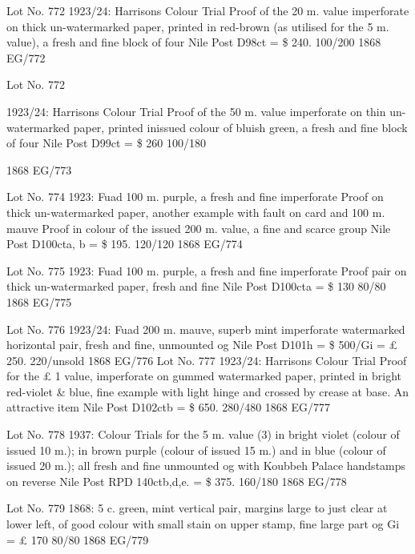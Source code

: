 \documentclass[justified]{tufte-book}
\begin{document}
%
{Lot No. 772
1923/24: Harrisons Colour Trial Proof of the 20 m. value imperforate on thick un-watermarked paper, printed in red-brown (as utilised for the 5 m. value), a fresh and fine block of four Nile Post D98ct = \$ 240. 100/200
}%
{1868}%
{EG/772}%
{}%
{}
{}%
{}

%
{Lot No. 772

1923/24: Harrisons Colour Trial Proof of the 50 m. value imperforate on thin un-watermarked paper, printed inissued colour of bluish green, a fresh and fine block of four Nile Post D99ct = \$ 260 100/180
}%
{1868}%
{EG/773}%
{}%
{}
{}%
{}

%
{Lot No. 774
1923: Fuad 100 m. purple, a fresh and fine imperforate Proof on thick un-watermarked paper, another example with fault on card and 100 m. mauve Proof in colour of the issued 200 m. value, a fine and scarce group Nile Post D100cta, b = \$ 195. 120/120
}%
{1868}%
{EG/774}%
{}%
{}
{}%
{}

%
{Lot No. 775
1923: Fuad 100 m. purple, a fresh and fine imperforate Proof pair on thick un-watermarked paper, fresh and fine Nile Post D100cta = \$ 130 80/80
}%
{1868}%
{EG/775}%
{}%
{}
{}%
{}

%
{Lot No. 776
1923/24: Fuad 200 m. mauve, superb mint imperforate watermarked horizontal pair, fresh and fine, unmounted og Nile Post D101h = \$ 500/Gi = £ 250. 220/unsold
}%
{1868}%
{EG/776}%
{}%
{}
{}%
{}
%
{Lot No. 777
1923/24: Harrisons Colour Trial Proof for the £ 1 value, imperforate on gummed watermarked paper, printed in bright red-violet \& blue, fine example with light hinge and crossed by crease at base. An attractive item Nile Post D102ctb = \$ 650. 280/480
}%
{1868}%
{EG/777}%
{}%
{}
{}%
{}

%
{
Lot No. 778
1937: Colour Trials for the 5 m. value (3) in bright violet (colour of issued 10 m.); in brown purple (colour of issued 15 m.) and in blue (colour of issued 20 m.); all fresh and fine unmounted og with Koubbeh Palace handstamps on reverse Nile Post RPD 140ctb,d,e. = \$ 375.   160/180
}%
{1868}%
{EG/778}%
{}%
{}
{}%
{}

%
{Lot No. 779
1868: 5 c. green, mint vertical pair, margins large to just clear at lower left, of good colour with small stain on upper stamp, fine large part og Gi = £ 170 80/80
}%
{1868}%
{EG/779}%
{}%
{}
{}%
{}
\end{document}
